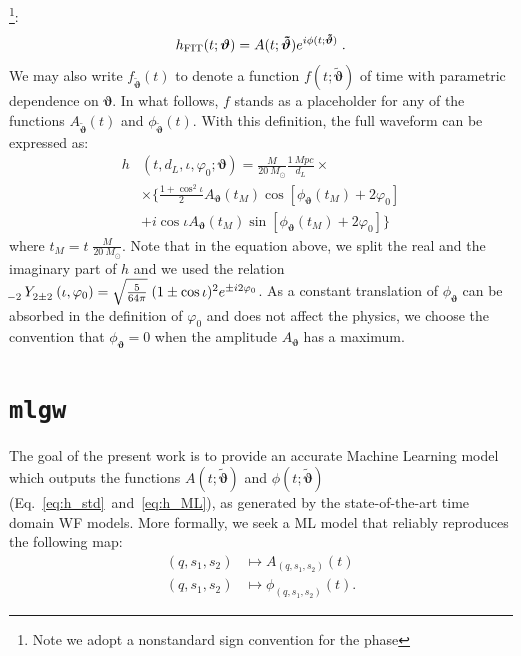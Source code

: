 \documentclass[twocolumn,showpacs,preprintnumbers,nofootinbib,prd,
superscriptaddress,10pt]{revtex4-1}
\begin{document}
\footnote{Note we adopt a nonstandard sign convention for the phase}:
\begin{equation} \label{eq:h_ML}
	h_{\rm FIT}(t; \boldsymbol{\vartheta}) = A(t; \boldsymbol{\tilde{\vartheta}}) e^{i \phi(t; \boldsymbol{\tilde{\vartheta}})} \; . 
\end{equation}
We may also write $f_{\boldsymbol{\tilde{\vartheta}}}(t)$ to denote a 
function $f(t;\boldsymbol{\tilde{\vartheta}})$ of time with parametric dependence on $\boldsymbol{\vartheta}$.
In what follows, $f$ stands as a placeholder for any of the functions $A_{\tilde{\boldsymbol{\vartheta}}}(t)$ 
and ${\phi}_{\tilde{\boldsymbol{\vartheta}}}(t)$.
With this definition, the full waveform can be expressed as:
\begin{align} 
	h&(t, d_L,\iota,\varphi_0; \boldsymbol{\vartheta}) = \frac{M}{\SI{20}{M_\odot}} \frac{\SI{1}{Mpc}}{d_L} \times  \nonumber \\
		&\times \Bigg\{ \frac{1+\cos^2\iota}{2} A_{\boldsymbol{\vartheta}}(t_M)  \cos[\phi_{\boldsymbol{\vartheta}}(t_M)+2\varphi_0]  \nonumber \\
		&+ i \cos\iota A_{\boldsymbol{\vartheta}}(t_M)
 \sin[\phi_{\boldsymbol{\vartheta}}(t_M)+2\varphi_0] \Bigg\}
\label{eq:h_parametrization_simple}
\end{align}
where $t_M = t \; \frac{M}{\SI{20}{M_\odot}}$.
Note that in the equation above, we split the real and the imaginary part of $h$ and we 
used the relation ${\tensor[_{-2}]{Y}{_{2 \pm 2}}(\iota, \varphi_0) = \sqrt{\frac{5}{64\pi}} \; (1 \pm \cos \iota)^2 e^{\pm i 2 \varphi_0}}$.
As a constant translation of $\phi_{\boldsymbol{\vartheta}}$ can be absorbed in the definition of $\varphi_0$ and does not affect the physics, we choose the convention that $\phi_{\boldsymbol{\vartheta}} = 0$ when the amplitude $A_{\boldsymbol{\vartheta}}$ 
has a maximum.

\section{\lowercase{\texttt{mlgw}}}
\label{sec:model}
%
The goal of the present work is to provide an accurate Machine Learning model which outputs the functions $A(t;\boldsymbol{\tilde{\vartheta}})$ and $\phi(t;\boldsymbol{\tilde{\vartheta}})$ (Eq.~\eqref{eq:h_std}~and~\eqref{eq:h_ML}), as generated by the state-of-the-art time domain WF models.
More formally, we seek a ML model that reliably reproduces the following map:
\begin{align}
	(q, s_1, s_2) &\longmapsto A_{(q, s_1, s_2)}(t) \label{eq:objective_amp}\\
	(q, s_1, s_2) &\longmapsto \phi_{(q, s_1, s_2)}(t) . \label{eq:objective_ph}
\end{align}
\end{document}
